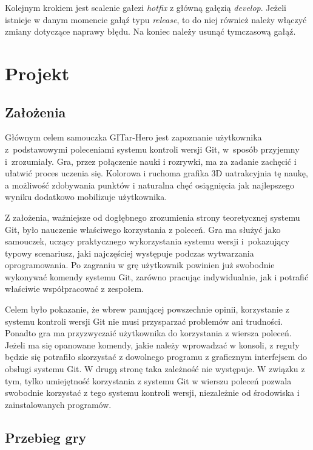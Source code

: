 \documentclass[11pt,a4paper,polish,thesis]{dcsbook}
\begin{document}
	Kolejnym krokiem jest scalenie gałezi \textit{hotfix} z główną gałęzią \textit{develop}. Jeżeli istnieje w danym momencie gałąź typu \textit{release}, to do niej również należy włączyć zmiany dotyczące naprawy błędu. Na koniec należy usunąć tymczasową gałąź.
	
	\chapter{Projekt}
	
	\section{Założenia}
		
	Głównym celem samouczka GITar-Hero jest zapoznanie użytkownika z~podstawowymi poleceniami systemu kontroli wersji Git, w~sposób przyjemny i~zrozumiały. Gra, przez połączenie nauki i rozrywki, ma za zadanie zachęcić i ułatwić proces uczenia się. Kolorowa i ruchoma grafika 3D uatrakcyjnia tę naukę, a możliwość zdobywania punktów i naturalna chęć osiągnięcia jak najlepszego wyniku dodatkowo mobilizuje użytkownika. 
	
	Z założenia, ważniejsze od dogłębnego zrozumienia strony teoretycznej systemu Git, było nauczenie właściwego korzystania z poleceń. Gra ma służyć jako samouczek, uczący praktycznego wykorzystania systemu wersji i~pokazujący typowy scenariusz, jaki najczęściej występuje podczas wytwarzania oprogramowania. Po zagraniu w grę użytkownik powinien już swobodnie wykonywać komendy systemu Git, zarówno pracując indywidualnie, jak i potrafić właściwie współpracować z zespołem. 
	
	Celem było pokazanie, że wbrew panującej powszechnie opinii, korzystanie z systemu kontroli wersji Git nie musi przysparzać problemów ani trudności. Ponadto gra ma przyzwyczaić użytkownika do korzystania z wiersza poleceń. Jeżeli ma się opanowane komendy, jakie należy wprowadzać w konsoli, z reguły będzie się potrafiło skorzystać z dowolnego programu z graficznym interfejsem do obsługi systemu Git. W drugą stronę taka zależność nie występuje. W związku z tym, tylko umiejętność korzystania z systemu Git w wierszu poleceń pozwala swobodnie korzystać z tego systemu kontroli wersji, niezależnie od środowiska i zainstalowanych programów.
	 
	\section{Przebieg gry}
	
\end{document}
